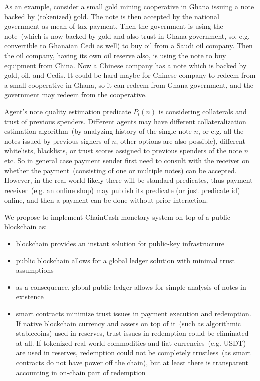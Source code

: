 \documentclass{article}   %
\newcommand{\cc}{ChainCash}
\begin{document}
As an example, consider a small gold mining cooperative in Ghana issuing a note backed by (tokenized) gold. The note is then accepted by the national government as mean of tax payment. Then the government is using the note~(which is now backed by gold and also trust in Ghana government, so, e.g. convertible to Ghanaian Cedi as well) to buy oil from a Saudi oil company. Then the oil company, having its own oil reserve also, is using the note to buy equipment from China. Now a Chinese company has a note which is backed by gold, oil, and Cedis. It could be hard maybe for Chinese company to redeem from a small cooperative in Ghana, so it can redeem from Ghana government, and the government may redeem from the cooperative.

Agent's note quality estimation predicate $P_i(n)$ is considering collaterals and trust of previous spenders. Different agents may have different 
collateralization estimation algorithm~(by analyzing history of the single note $n$, or e.g. all the notes issued by previous signers of $n$, other options are also possible), different whitelists, blacklists, or trust scores assigned to previous spenders of the note $n$ etc. So in general case payment sender first need to consult with the receiver on whether the payment~(consisting of one or multiple notes) can be accepted. However, in the real world likely there will be standard predicates, thus payment receiver~(e.g. an online shop) may publish its predicate (or just predicate id) online, and then a payment can be done without prior interaction.

We propose to implement \cc{} monetary system on top of a public blockchain as:

\begin{itemize}
  \item{} blockchain provides an instant solution for public-key infrastructure
  \item{} public blockchain allows for a global ledger solution with minimal trust assumptions~\cite{kya}
  \item{} as a consequence, global public ledger allows for simple analysis of notes in existence
  \item{} smart contracts minimize trust issues in payment execution and redemption. If native blockchain currency and assets on top of it~(such as algorithmic stablecoins) used in reserves, trust issues in redemption could be eliminated at all. If tokenized real-world commodities and fiat currencies~(e.g. USDT) are used in reserves, redemption could not be completely trustless~(as smart contracts do not have power off the chain), but at least there is transparent accounting in on-chain part of redemption
\end{itemize}
\end{document}
